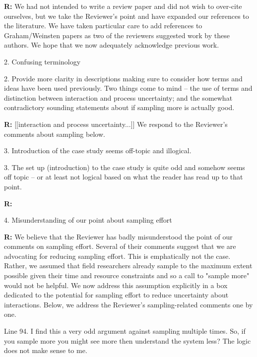 \documentclass[12pt]{letter}
\newenvironment{refquote}{\bigskip \begin{it}}{\end{it}\smallskip}
\begin{document}
	\textbf{R:} We had not intended to write a review paper and did not wish to over-cite ourselves, but we take the Reviewer's point and have expanded our references to the literature. We have taken particular care to add references to Graham/Weinsten papers as two of the reviewers suggested work by these authors. We hope that we now adequately acknowledge previous work.

	2. Confusing terminology

	\begin{refquote}
	2.      Provide more clarity in descriptions making sure to consider how terms and ideas have been used previously.  Two things come to mind – the use of terms and distinction between interaction and process uncertainty; and the somewhat contradictory sounding statements about if sampling more is actually good.
	\end{refquote}

	\textbf{R:} [[interaction and process uncertainty...]] We respond to the Reviewer's comments about sampling below.


	3. Introduction of the case study seems off-topic and illogical.

	\begin{refquote}
	3.      The set up (introduction) to the case study is quite odd and somehow seems off topic – or at least not logical based on what the reader has read up to that point.
	\end{refquote}

	\textbf{R:} 

	4. Misunderstanding of our point about sampling effort

		\textbf{R:} We believe that the Reviewer has badly misunderstood the point of our comments on sampling effort. Several of their comments suggest that we are advocating for reducing sampling effort. This is emphatically not the case. Rather, we assumed that field researchers already sample to the maximum extent possible given their time and resource constraints and so a call to "sample more" would not be helpful. We now address this assumption explicitly in a box dedicated to the potential for sampling effort to reduce uncertainty about interactions. Below, we address the Reviewer's sampling-related comments one by one.


		\begin{refquote}
		Line 94.  I find this a very odd argument against sampling multiple times.  So, if you sample more you might see more then understand the system less?  The logic does not make sense to me. 
		\end{refquote}
\end{document}
